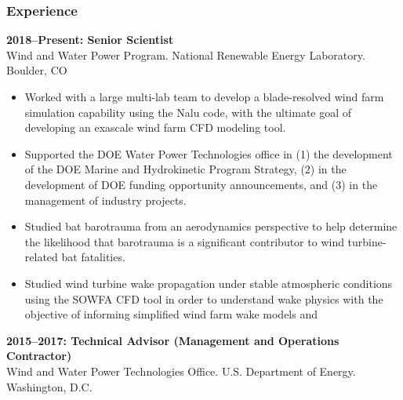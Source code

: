 \subsubsection*{Experience}
\vspace{-0.15in}

\textbf{2018--Present: Senior Scientist} \\
Wind and Water Power Program. National Renewable Energy Laboratory. Boulder, CO\\
\vspace{-0.35in}
\begin{itemize}
  \item Worked with a large multi-lab team to develop a blade-resolved wind farm simulation capability using the Nalu code, with the ultimate goal of developing an exascale wind farm CFD modeling tool.
  \vspace{-0.1in}
  \item Supported the DOE Water Power Technologies office in (1) the development of the DOE Marine and Hydrokinetic Program Strategy, (2) in the development of DOE funding opportunity announcements, and (3) in the management of industry projects.
  \vspace{-0.1in}
  \item Studied bat barotrauma from an aerodynamics perspective to help determine the likelihood that barotrauma is a significant contributor to wind turbine-related bat fatalities.
  \vspace{-0.1in}
  \item Studied wind turbine wake propagation under stable atmospheric conditions using the SOWFA CFD tool in order to understand wake physics with the objective of informing simplified wind farm wake models and
\end{itemize}
\vspace{-0.2in}
\textbf{2015--2017: Technical Advisor (Management and Operations Contractor)}\\
Wind and Water Power Technologies Office. U.S. Department of Energy. Washington, D.C.\\
\vspace{-0.35in}
